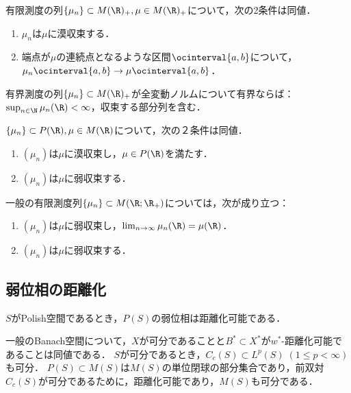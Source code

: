 \documentclass[uplatex,dvipdfmx]{jsreport}
\begin{document}
\begin{proposition}[漠収束の特徴付け]
    有限測度の列$\{\mu_n\}\subset M(\R)_+,\mu\in M(\R)_+$について，次の2条件は同値．
    \begin{enumerate}
        \item $\mu_n$は$\mu$に漠収束する．
        \item 端点が$\mu$の連続点となるような区間$\ocinterval{a,b}$について，$\mu_n\ocinterval{a,b}\to\mu\ocinterval{a,b}$．
    \end{enumerate}
\end{proposition}

\begin{proposition}[Hellyの選出定理の系]
    有界測度の列$\{\mu_n\}\subset M(\R)_+$が全変動ノルムについて有界ならば：$\sup_{n\in\N}\mu_n(\R)<\infty$，収束する部分列を含む．
\end{proposition}

\begin{proposition}[漠収束による特徴付け]\label{prop-characterization-of-value-convergence}
    $\{\mu_n\}\subset P(\R),\mu\in M(\R)$について，次の２条件は同値．
    \begin{enumerate}
        \item $(\mu_n)$は$\mu$に漠収束し，$\mu\in P(\R)$を満たす．
        \item $(\mu_n)$は$\mu$に弱収束する．
    \end{enumerate}
    一般の有限測度列$\{\mu_n\}\subset M(\R;\R_+)$については，次が成り立つ：
    \begin{enumerate}
        \item $(\mu_n)$は$\mu$に弱収束し，$\lim_{n\to\infty}\mu_n(\R)=\mu(\R)$．
        \item $(\mu_n)$は$\mu$に弱収束する．
    \end{enumerate}
\end{proposition}

\subsection{弱位相の距離化}

\begin{tcolorbox}[colframe=ForestGreen, colback=ForestGreen!10!white,breakable,colbacktitle=ForestGreen!40!white,coltitle=black,fonttitle=\bfseries\sffamily,
title=]
    $S$がPolish空間であるとき，$P(S)$の弱位相は距離化可能である．

    一般のBanach空間について，$X$が可分であることと$B^*\subset X^*$が$w^*$-距離化可能であることは同値である．
    $S$が可分であるとき，$C_c(S)\subset L^p(S)\;(1\le p<\infty)$も可分．
    $P(S)\subset M(S)$は$M(S)$の単位閉球の部分集合であり，前双対$C_c(S)$が可分であるために，距離化可能であり，$M(S)$も可分である．
\end{tcolorbox}
\end{document}
